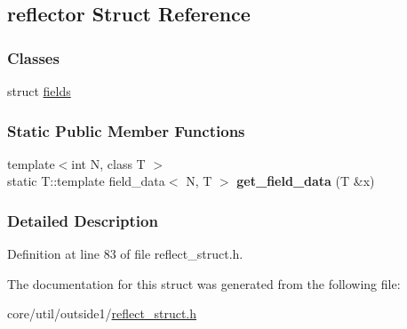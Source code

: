 \hypertarget{structreflector}{}\subsection{reflector Struct Reference}
\label{structreflector}
\subsubsection*{Classes}
\begin{DoxyCompactItemize}
\item 
struct \hyperlink{structreflector_1_1fields}{fields}
\end{DoxyCompactItemize}
\subsubsection*{Static Public Member Functions}
\begin{DoxyCompactItemize}
\item 
{\footnotesize template$<$int N, class T $>$ }\\static T\+::template field\+\_\+data$<$ N, T $>$ {\bfseries get\+\_\+field\+\_\+data} (T \&x)\hypertarget{structreflector_a6bcd858faea5bec6fa12bbf11186d2fd}{}\label{structreflector_a6bcd858faea5bec6fa12bbf11186d2fd}

\end{DoxyCompactItemize}


\subsubsection{Detailed Description}


Definition at line 83 of file reflect\+\_\+struct.\+h.



The documentation for this struct was generated from the following file\+:\begin{DoxyCompactItemize}
\item 
core/util/outside1/\hyperlink{reflect__struct_8h}{reflect\+\_\+struct.\+h}\end{DoxyCompactItemize}
